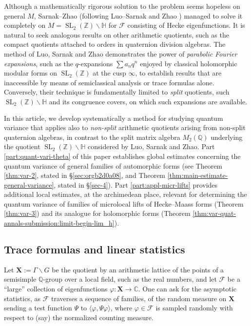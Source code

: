 \documentclass[reqno,10pt]{amsart}
\theoremstyle{plain} %
\theoremstyle{definition}
\theoremstyle{plain} %
\theoremstyle{remark}
\theoremstyle{itplain} %
\theoremstyle{remark} %
\numberwithin{equation}{section}
\DeclareMathOperator{\SL}{SL}
\begin{document}
Although a mathematically rigorous solution to the problem seems hopeless on general $M$, Sarnak--Zhao \cite{2013arXiv1303.6972S} (following Luo--Sarnak \cite{luo-sarnak-mass} and Zhao \cite{MR2651907}) managed to solve it completely on %
$M = \SL_2(\mathbb{Z}) \backslash \mathbb{H}$ for $\mathcal{F}$ consisting of Hecke eigenfunctions.  It is natural to seek analogous results on other arithmetic quotients, such as the compact quotients attached to orders in quaternion division algebras.  The method of Luo, Sarnak and Zhao demonstrates the power of \emph{parabolic Fourier expansions}, such as the $q$-expansions $\sum a_n q^n$ enjoyed by classical holomorphic modular forms on $\SL_2(\mathbb{Z})$ at the cusp $\infty$, to establish results that are inaccessible by means of semiclassical analysis or trace formulas alone.  Conversely, their technique is fundamentally limited to \emph{split} quotients, such $\SL_2(\mathbb{Z}) \backslash \mathbb{H}$ and its congruence covers, on which such expansions are available.

In this article, we develop systematically a method for studying quantum variance that applies also to \emph{non-split} arithmetic quotients arising from non-split quaternion algebras, in contrast to the split matrix algebra $M_2(\mathbb{Q})$ underlying the quotient $\SL_2(\mathbb{Z}) \backslash \mathbb{H}$ considered by Luo, Sarnak and Zhao.  Part \ref{part:quant-vari-theta} of this paper establishes global estimates concerning the quantum variance of general families of automorphic forms (see Theorem \ref{thm:var-2}, stated in \S\ref{sec:orgb2d0a08}, and
Theorem \ref{thm:main-estimate-general-variance}, stated in \S\ref{sec-4}).  Part \ref{part:appl-micr-lifts} provides additional local estimates, at the archimedean place, relevant for determining the quantum variance of families of microlocal lifts of Hecke--Maass forms (Theorem \ref{thm:var-3}) and its analogue for holomorphic forms (Theorem \ref{thm:var-quat-annals-submission:limit-begin-lim_h}).

\subsection{Trace formulas and linear statistics}\label{sec:trace-formula-linear}
Let $\mathbf{X} := \Gamma \backslash G$ be the quotient by an arithmetic lattice of the points of a semisimple $\mathbb{Q}$-group over a local field, such as the real numbers, and let $\mathcal{F}$ be a ``large'' collection of eigenfunctions $\varphi : \mathbf{X} \rightarrow \mathbb{C}$.
One can ask for the asymptotic statistics, as $\mathcal{F}$ traverses a sequence of families, of the random measure on $\mathbf{X}$ sending a test function $\Psi$ to $\langle \varphi, \Psi \varphi \rangle$, where $\varphi \in \mathcal{F}$ is sampled randomly with respect to (say) the normalized counting measure.
\end{document}
